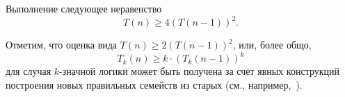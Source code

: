     \begin{corollary}
    \label{uso:lowerbound}
        Выполнение следующее неравенство 
        \[
            T(n) \ge 4 \left( T(n-1) \right)^2.
        \]
    \end{corollary}

    Отметим, что оценка вида $T(n) \ge 2 \left( T(n-1) \right)^2$, или, более общо, 
    \[
        T_k(n) \ge k \cdot \left( T_k(n-1) \right)^k
    \] 
    для случая $k$-значной логики может быть получена за счет явных конструкций построения новых правильных семейств из старых (см., например,~\cite[теорема~2]{galatenko20algo}).






